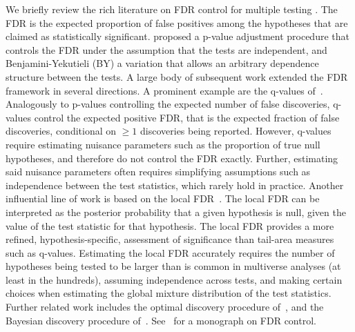 \documentclass[pdflatex,sn-mathphys-num]{sn-jnl}%
\theoremstyle{thmstyleone}%
\theoremstyle{thmstyletwo}%
\theoremstyle{thmstylethree}%
\begin{document}
We briefly review the rich literature on FDR control for multiple testing \citep{benjamini:1995}.
The FDR is the expected proportion of false positives among the hypotheses that are claimed as statistically significant.
\cite{benjamini:1995} proposed a p-value adjustment procedure that controls the FDR under the assumption that the tests are independent, \color{blue} and Benjamini-Yekutieli (BY) \cite{benjamini:2001} a variation that allows an arbitrary dependence structure between the tests. \color{black}
A large body of subsequent work extended the FDR framework in several directions.
A prominent example are the q-values of~\cite{storey:2003}.
Analogously to p-values controlling the expected number of false discoveries, q-values control the expected positive FDR, that is the expected fraction of false discoveries, conditional on $\geq 1$ discoveries being reported.
However, q-values require estimating nuisance parameters such as the proportion of true null hypotheses, and therefore do not control the FDR exactly. Further, estimating said nuisance parameters often requires simplifying assumptions such as independence between the test statistics, which rarely hold in practice.
Another influential line of work is based on the local FDR~\citep{efron:2001}. %
The local FDR can be interpreted as the posterior probability that a given hypothesis is null, given the value of the test statistic for that hypothesis. The local FDR provides a more refined, hypothesis-specific, assessment of significance than tail-area measures such as q-values. 
Estimating the local FDR accurately requires the number of hypotheses being tested to be larger than is common in multiverse analyses (at least in the hundreds), assuming independence across tests, and making certain choices when estimating the global mixture distribution of the test statistics.
Further related work includes the optimal discovery procedure of~\cite{storey:2007}, and the Bayesian discovery procedure of~\cite{guindani:2009}. See~\cite{efron:2012} for a monograph on FDR control.
\end{document}
